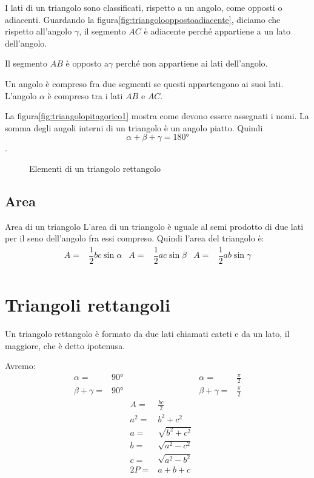 I lati di un triangolo sono classificati, rispetto a un angolo, come opposti o  adiacenti. Guardando la figura\nobs\vref{fig:triangolooppostoadiacente}, diciamo che rispetto all'angolo $\gamma$, il segmento $AC$ è adiacente perché appartiene a un  lato dell'angolo.\par  Il segmento  $AB$ è opposto a$\gamma$ perché  non appartiene ai lati  dell'angolo.\par
Un angolo è compreso fra due segmenti se questi appartengono ai suoi lati. L'angolo $\alpha$ è compreso tra i lati $AB$ e $AC$.\par 
 La figura\nobs\vref{fig:triangolopitagorico1} mostra come devono essere assegnati i nomi.
La somma degli angoli interni di un triangolo è un angolo piatto. Quindi \[\alpha+\beta+\gamma=\ang{180}\]. 
\begin{figure}
	\centering
	
	\caption{Elementi di un triangolo rettangolo}
	\label{fig:triangolooppostoadiacente}
\end{figure}
\subsection{Area}
\begin{teoremat}{Area di un triangolo}{}
	L'area di un triangolo è uguale al semi prodotto di due lati per il seno dell'angolo fra essi compreso. 
	Quindi l'area del triangolo è:
	\begin{align*}
	A=&\dfrac{1}{2}bc\sin\alpha& A=&\dfrac{1}{2}ac\sin\beta& A=&\dfrac{1}{2}ab\sin\gamma \\
	\end{align*}
\end{teoremat}	
\section{Triangoli rettangoli}
 Un triangolo rettangolo è formato da due lati chiamati cateti e da un lato, il maggiore, che è detto ipotenusa.\par Avremo:\begin{align*}
 \alpha=&{}\ang{90}&&&\alpha=&{}\frac{\pi}{2}\\
 \beta+\gamma=&{}\ang{90}&&&\beta+\gamma=&{}\frac{\pi}{2}\\
 &&A={}&\frac{bc}{2}\\
 &&a^2={}&b^2+c^2\\
  &&a={}&\sqrt{b^2+c^2}\\
  &&b={}&\sqrt{a^2-c^2}\\
  &&c={}&\sqrt{a^2-b^2}\\
  &&2P=&a+b+c
 \end{align*}
